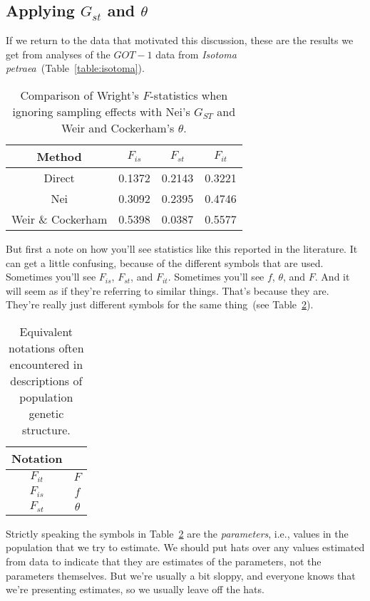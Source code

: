 \subsection*{Applying $G_{st}$ and $\theta$}

If we return to the data that motivated this discussion, these are the
results we get from analyses of the $GOT-1$ data from {\it Isotoma
  petraea}~(Table~\ref{table:isotoma}). 
\begin{table}
\begin{center}
  \begin{tabular}{c|ccc}
\hline\hline
Method & $F_{is}$ & $F_{st}$ & $F_{it}$ \\
\hline
Direct            & 0.1372 & 0.2143 & 0.3221 \\
Nei               & 0.3092 & 0.2395 & 0.4746 \\
Weir \& Cockerham & 0.5398 & 0.0387 & 0.5577 \\
\hline
\end{tabular}
\end{center}
\caption{Comparison of Wright's $F$-statistics when ignoring sampling
  effects with Nei's $G_{ST}$ and Weir and Cockerham's $\theta$.}\label{table:fst-comparison}
\end{table}
But first a note on how you'll see statistics like this reported in
the literature. It can get a little confusing, because of the
different symbols that are used. Sometimes you'll see $F_{is}$,
$F_{st}$, and $F_{it}$. Sometimes you'll see $f$, $\theta$, and
$F$. And it will seem as if they're referring to similar
things. That's because they are. They're really just different symbols
for the same thing~(see
Table~\ref{table:fst-theta}).
\begin{table}
\begin{center}
\begin{tabular}{cc}
\hline\hline
Notation \\
\hline
$F_{it}$ & $F$ \\
$F_{is}$ & $f$ \\
$F_{st}$ & $\theta$ \\
\hline
\end{tabular}
\end{center}
\caption{Equivalent notations often encountered in descriptions of
  population genetic structure.}\label{table:fst-theta}
\end{table}
Strictly speaking the symbols in Table~\ref{table:fst-theta} are the
{\it parameters}, i.e., values in the population that we try to
estimate. We should put hats over any values estimated from data to
indicate that they are estimates of the parameters, not the parameters
themselves. But we're usually a bit sloppy, and everyone knows that
we're presenting estimates, so we usually leave off the hats.

